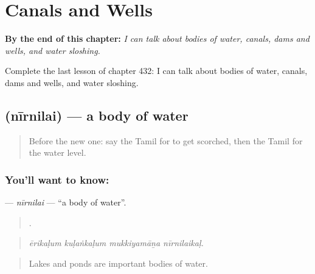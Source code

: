 
\chapter{Canals and Wells}
\label{ch:ta-canals-and-wells}

\begin{chapteropening}
\textbf{By the end of this chapter:} \emph{I can talk about bodies of water, canals, dams and wells, and water sloshing.}

Complete the last lesson of chapter 432: I can talk about bodies of water, canals, dams and wells, and water sloshing.
\end{chapteropening}

\section[\texorpdfstring{\ta{நீர்நிலை} (nīrnilai)}{நீர்நிலை (nīrnilai)}]{ (nīrnilai) — a body of water}

\label{lesson:TA-C432-nirnilai}



\begin{quote}
Before the new one: say the Tamil for to get scorched, then the Tamil for the water level.
\end{quote}

\subsection*{You'll want to know: }
\textbf{} — \emph{nīrnilai} — \textquotedblleft{}a body of water\textquotedblright{}.

\begin{quote}
   .
\end{quote}

\begin{quote}
\emph{ērikaḷum kuḷaṅkaḷum mukkiyamāṉa nīrnilaikaḷ.}
\end{quote}

\begin{quote}
Lakes and ponds are important bodies of water.
\end{quote}

